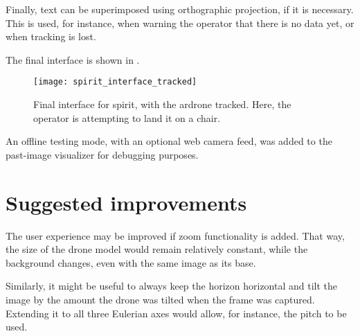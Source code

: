     Finally, text can be superimposed using orthographic projection, if it is necessary.
    This is used, for instance, when warning the operator that there is no data yet, or when tracking is lost.

    The final interface is shown in .

    \begin{figure}[h]
      \centering
      \texttt{[image: spirit\_interface\_tracked]}
      \caption[SPIRIT final interface]{Final interface for \gls{spirit}, with the \gls{ardrone} tracked. Here, the operator is attempting to land it on a chair.}
      \label{fig:spirit_interface_tracked}
    \end{figure}
    
    An offline testing mode, with an optional web camera feed, was added to the past-image visualizer for debugging purposes.


  \section{Suggested improvements}
    The user experience may be improved if zoom functionality is added.
    That way, the size of the drone model would remain relatively constant, while the background changes, even with the same image as its base.
    
    Similarly, it might be useful to always keep the horizon horizontal and tilt the image by the amount the drone was tilted when the frame was captured.
    Extending it to all three Eulerian axes would allow, for instance, the pitch to be used.
